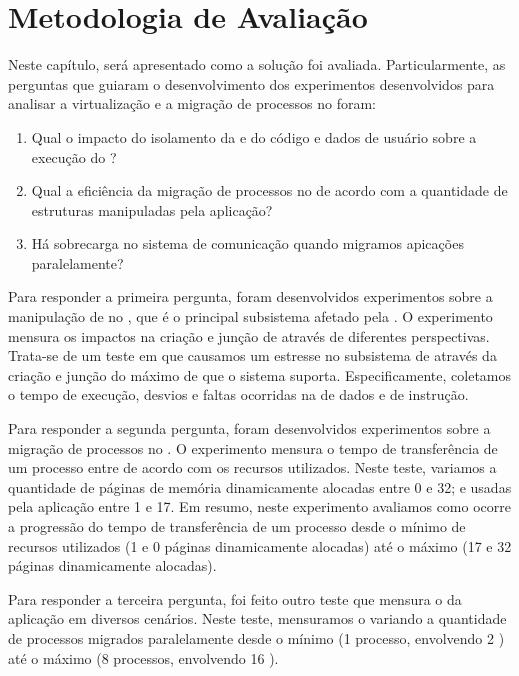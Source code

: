 \glsresetall
\chapter{Metodologia de Avaliação}
\label{chap.experiment-methodology}
Neste capítulo, será apresentado como a solução foi avaliada. Particularmente, as perguntas que guiaram o desenvolvimento dos experimentos desenvolvidos para analisar a virtualização e a migração de processos no \nanvix foram:

\begin{enumerate}[label=(\roman*)]
    \item Qual o impacto do isolamento da \uarea e do código e dados de usuário sobre a execução do \nanvix?
    \item Qual a eficiência da migração de processos no \nanvix de acordo com a quantidade de estruturas manipuladas pela aplicação?
    \item Há sobrecarga no sistema de comunicação quando migramos apicações paralelamente?
\end{enumerate}

Para responder a primeira pergunta, foram desenvolvidos experimentos sobre a manipulação de \threads no \nanvix, que é o principal subsistema afetado pela \uarea. O experimento mensura os impactos na criação e junção de \threads através de diferentes perspectivas. Trata-se de um teste em que causamos um estresse no subsistema de \threads através da criação e junção do máximo de \threads que o sistema suporta. Especificamente, coletamos o tempo de execução, desvios e faltas ocorridas na \cache de dados e de instrução.

Para responder a segunda pergunta, foram desenvolvidos experimentos sobre a migração de processos no \nanvix. O experimento mensura o tempo de transferência de um processo entre \clusters de acordo com os recursos utilizados. Neste teste, variamos a quantidade de páginas de memória dinamicamente alocadas entre 0 e 32; e \threads usadas pela aplicação entre 1 e 17. Em resumo, neste experimento avaliamos como ocorre a progressão do tempo de transferência de um processo desde o mínimo de recursos utilizados (1 \thread e 0 páginas dinamicamente alocadas) até o máximo (17 \threads e 32 páginas dinamicamente alocadas).

Para responder a terceira pergunta, foi feito outro teste que mensura o \downtime da aplicação em diversos cenários. Neste teste, mensuramos o \downtime variando a quantidade de processos migrados paralelamente desde o mínimo (1 processo, envolvendo 2 \clusters) até o máximo (8 processos, envolvendo 16 \clusters).

